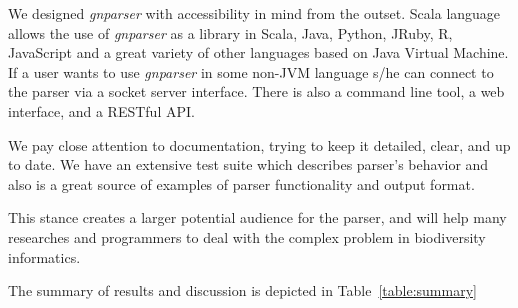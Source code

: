\documentclass{bmcart}
\begin{document}
We designed \textit{gnparser} with accessibility in mind from the outset. Scala
language allows the use of \textit{gnparser} as a library in Scala, Java,
Python, JRuby, R, JavaScript and a great variety of other languages based on
Java Virtual Machine. If a user wants to use \textit{gnparser}  in some non-JVM language s/he
can connect to the parser via a socket server interface. There is also a
command line tool, a web interface, and a RESTful API.

We pay close attention to documentation, trying to keep it detailed, clear, and
up to date. We have an extensive test suite which describes parser's behavior
and also is a great source of examples of parser  functionality and output
format.

This stance creates a larger potential audience for the parser, and will help many
researches and programmers to deal with the complex problem in biodiversity
informatics.

The summary of results and discussion is depicted in
Table~\ref{table:summary}
\end{document}
